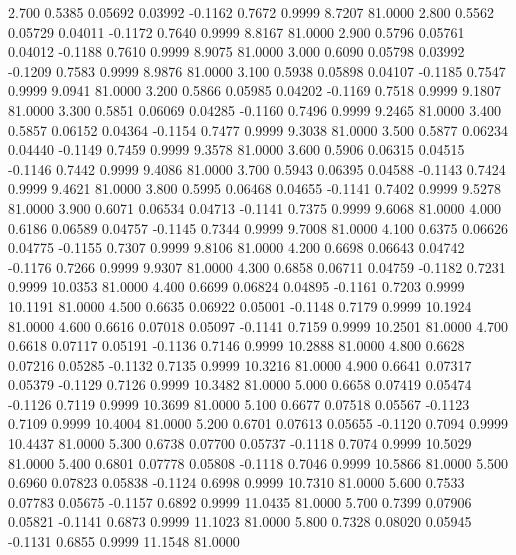    2.700   0.5385   0.05692   0.03992  -0.1162   0.7672   0.9999   8.7207  81.0000
   2.800   0.5562   0.05729   0.04011  -0.1172   0.7640   0.9999   8.8167  81.0000
   2.900   0.5796   0.05761   0.04012  -0.1188   0.7610   0.9999   8.9075  81.0000
   3.000   0.6090   0.05798   0.03992  -0.1209   0.7583   0.9999   8.9876  81.0000
   3.100   0.5938   0.05898   0.04107  -0.1185   0.7547   0.9999   9.0941  81.0000
   3.200   0.5866   0.05985   0.04202  -0.1169   0.7518   0.9999   9.1807  81.0000
   3.300   0.5851   0.06069   0.04285  -0.1160   0.7496   0.9999   9.2465  81.0000
   3.400   0.5857   0.06152   0.04364  -0.1154   0.7477   0.9999   9.3038  81.0000
   3.500   0.5877   0.06234   0.04440  -0.1149   0.7459   0.9999   9.3578  81.0000
   3.600   0.5906   0.06315   0.04515  -0.1146   0.7442   0.9999   9.4086  81.0000
   3.700   0.5943   0.06395   0.04588  -0.1143   0.7424   0.9999   9.4621  81.0000
   3.800   0.5995   0.06468   0.04655  -0.1141   0.7402   0.9999   9.5278  81.0000
   3.900   0.6071   0.06534   0.04713  -0.1141   0.7375   0.9999   9.6068  81.0000
   4.000   0.6186   0.06589   0.04757  -0.1145   0.7344   0.9999   9.7008  81.0000
   4.100   0.6375   0.06626   0.04775  -0.1155   0.7307   0.9999   9.8106  81.0000
   4.200   0.6698   0.06643   0.04742  -0.1176   0.7266   0.9999   9.9307  81.0000
   4.300   0.6858   0.06711   0.04759  -0.1182   0.7231   0.9999  10.0353  81.0000
   4.400   0.6699   0.06824   0.04895  -0.1161   0.7203   0.9999  10.1191  81.0000
   4.500   0.6635   0.06922   0.05001  -0.1148   0.7179   0.9999  10.1924  81.0000
   4.600   0.6616   0.07018   0.05097  -0.1141   0.7159   0.9999  10.2501  81.0000
   4.700   0.6618   0.07117   0.05191  -0.1136   0.7146   0.9999  10.2888  81.0000
   4.800   0.6628   0.07216   0.05285  -0.1132   0.7135   0.9999  10.3216  81.0000
   4.900   0.6641   0.07317   0.05379  -0.1129   0.7126   0.9999  10.3482  81.0000
   5.000   0.6658   0.07419   0.05474  -0.1126   0.7119   0.9999  10.3699  81.0000
   5.100   0.6677   0.07518   0.05567  -0.1123   0.7109   0.9999  10.4004  81.0000
   5.200   0.6701   0.07613   0.05655  -0.1120   0.7094   0.9999  10.4437  81.0000
   5.300   0.6738   0.07700   0.05737  -0.1118   0.7074   0.9999  10.5029  81.0000
   5.400   0.6801   0.07778   0.05808  -0.1118   0.7046   0.9999  10.5866  81.0000
   5.500   0.6960   0.07823   0.05838  -0.1124   0.6998   0.9999  10.7310  81.0000
   5.600   0.7533   0.07783   0.05675  -0.1157   0.6892   0.9999  11.0435  81.0000
   5.700   0.7399   0.07906   0.05821  -0.1141   0.6873   0.9999  11.1023  81.0000
   5.800   0.7328   0.08020   0.05945  -0.1131   0.6855   0.9999  11.1548  81.0000
